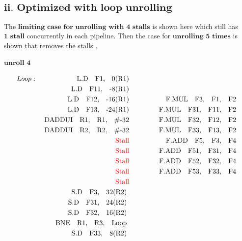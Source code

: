 \documentclass{tufte-handout}
\begin{document}
	\subsection{$\textbf{ii. Optimized with loop unrolling}$}
	The $\textbf{limiting case for unrolling with 4 stalls}$ is shown here which still has $\textbf{1 stall}$ concurrently in each pipeline. Then the case for $\textbf{unrolling 5 times}$ is shown that removes the stalls .
	\paragraph{$\textbf{unroll 4}$}
		\begin{alignat*}{3}
			Loop : & & \mbox{ L.D\quad F1,\quad 0(R1)}       \quad\quad\quad    &&   \\
			       & & \mbox{ L.D\quad F11,\quad -8(R1)}       \quad\quad\quad    &&   \\
			       & & \mbox{ L.D\quad F12,\quad -16(R1)}       \quad\quad\quad    &&  \mbox{ F.MUL\quad F3,\quad F1,\quad F2  }  \\
			       & & \mbox{ L.D\quad F13,\quad -24(R1)}       \quad\quad\quad    &&  \mbox{ F.MUL\quad F31,\quad F11,\quad F2  }   \\
			       & & \mbox{ DADDUI\quad R1,\quad R1,\quad \#-32}       \quad\quad\quad    &&  \mbox{ F.MUL\quad F32,\quad F12,\quad F2  }  \\
			       & & \mbox{ DADDUI\quad R2,\quad R2,\quad \#-32}       \quad\quad\quad    &&  \mbox{ F.MUL\quad F33,\quad F13,\quad F2  }  \\
			       & & \mbox{ \textcolor{red}{Stall}}       \quad\quad\quad    &&  \mbox{ F.ADD\quad F5,\quad F3,\quad F4  }  \\
			       & & \mbox{ \textcolor{red}{Stall}}       \quad\quad\quad    &&  \mbox{ F.ADD\quad F51,\quad F31,\quad F4  }  \\
			       & & \mbox{ \textcolor{red}{Stall}}       \quad\quad\quad    &&  \mbox{ F.ADD\quad F52,\quad F32,\quad F4  }  \\
			       & & \mbox{ \textcolor{red}{Stall}}       \quad\quad\quad    &&  \mbox{ F.ADD\quad F53,\quad F33,\quad F4  }  \\
			       & & \mbox{ \textcolor{red}{Stall}}       \quad\quad\quad    &&    \\
			       & & \mbox{ S.D\quad F3,\quad 32(R2) }       \quad\quad\quad    &&    \\
			       & & \mbox{ S.D\quad F31,\quad 24(R2) }       \quad\quad\quad    &&    \\
			       & & \mbox{ S.D\quad F32,\quad 16(R2) }       \quad\quad\quad    &&    \\
			       & & \mbox{ BNE\quad R1,\quad R3,\quad Loop }             \quad\quad\quad       &&    \\
			       & & \mbox{ S.D\quad F33,\quad 8(R2) }       \quad\quad\quad    &&    \\
		\end{alignat*}
\end{document}
